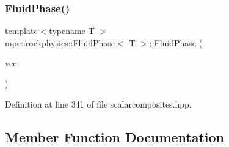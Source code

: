 \subsubsection{\texorpdfstring{Fluid\+Phase()}{FluidPhase()}}
{\footnotesize\ttfamily template$<$typename T $>$ \\
\mbox{\hyperlink{classmpc_1_1rockphysics_1_1_fluid_phase}{mpc\+::rockphysics\+::\+Fluid\+Phase}}$<$ T $>$\+::\mbox{\hyperlink{classmpc_1_1rockphysics_1_1_fluid_phase}{Fluid\+Phase}} (\begin{DoxyParamCaption}\item[{const std\+::vector$<$ std\+::tuple$<$ \mbox{\hyperlink{structmpc_1_1rockphysics_1_1_bulk_modulus_type}{mpc\+::rockphysics\+::\+Bulk\+Modulus\+Type}}$<$ T $>$, \mbox{\hyperlink{structmpc_1_1rockphysics_1_1_shear_modulus_type}{mpc\+::rockphysics\+::\+Shear\+Modulus\+Type}}$<$ T $>$, \mbox{\hyperlink{structmpc_1_1rockphysics_1_1_density_type}{mpc\+::rockphysics\+::\+Density\+Type}}$<$ T $>$, \mbox{\hyperlink{structmpc_1_1rockphysics_1_1_volume_fraction_type}{mpc\+::rockphysics\+::\+Volume\+Fraction\+Type}}$<$ T $>$ $>$ $>$ \&}]{vec }\end{DoxyParamCaption})\hspace{0.3cm}{\ttfamily [inline]}}



Definition at line 341 of file scalarcomposites.\+hpp.



\subsection{Member Function Documentation}
\mbox{\label{classmpc_1_1rockphysics_1_1_fluid_phase_a7f6accc4d8dfd7b8e6f55f3338698121}} 
